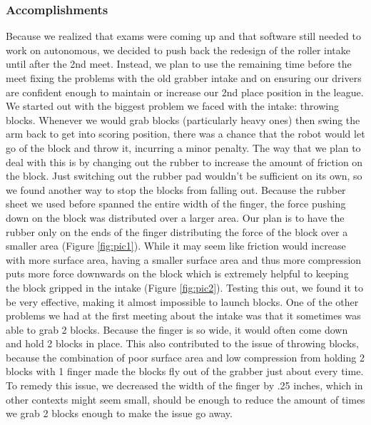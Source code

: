 \subsubsection*{Accomplishments}
Because we realized that exams were coming up and that software still needed to work on autonomous, we decided to push back the redesign of the roller intake until after the 2nd meet. Instead, we plan to use the remaining time before the meet fixing the problems with the old grabber intake and on ensuring our drivers are confident enough to maintain or increase our 2nd place position in the league.
We started out with the biggest problem we faced with the intake: throwing blocks. Whenever we would grab blocks (particularly heavy ones) then swing the arm back to get into scoring position, there was a chance that the robot would let go of the block and throw it, incurring a minor penalty. The way that we plan to deal with this is by changing out the rubber to increase the amount of friction on the block. Just switching out the rubber pad wouldn’t be sufficient on its own, so we found another way to stop the blocks from falling out. Because the rubber sheet we used before spanned the entire width of the finger, the force pushing down on the block was distributed over a larger area. Our plan is to have the rubber only on the ends of the finger distributing the force of the block over a smaller area (Figure \ref{fig:pic1}). While it may seem like friction would increase with more surface area, having a smaller surface area and thus more compression puts more force downwards on the block which is extremely helpful to keeping the block gripped in the intake (Figure \ref{fig:pic2}). Testing this out, we found it to be very effective, making it almost impossible to launch blocks.
One of the other problems we had at the first meeting about the intake was that it sometimes was able to grab 2 blocks. Because the finger is so wide, it would often come down and hold 2 blocks in place. This also contributed to the issue of throwing blocks, because the combination of poor surface area and low compression from holding 2 blocks with 1 finger made the blocks fly out of the grabber just about every time. To remedy this issue, we decreased the width of the finger by .25 inches, which in other contexts might seem small, should be enough to reduce the amount of times we grab 2 blocks enough to make the issue go away.

 

